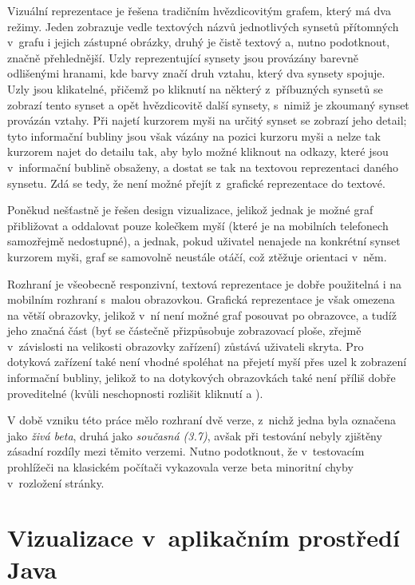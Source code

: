 \documentclass[a4paper, 11pt, oneside, showtrims]{book}
\begin{document}
					Vizuální reprezentace je řešena tradičním hvězdicovitým grafem, který má dva režimy. Jeden zobrazuje vedle textových názvů jednotlivých synsetů přítomných v~grafu i jejich zástupné obrázky, druhý je čistě textový a, nutno podotknout, značně přehlednější. Uzly reprezentující synsety jsou provázány barevně odlišenými hranami, kde barvy značí druh vztahu, který dva synsety spojuje. Uzly jsou klikatelné, přičemž po kliknutí na některý z~příbuzných synsetů se zobrazí tento synset a opět hvězdicovitě další synsety, s~nimiž je zkoumaný synset provázán vztahy. Při najetí kurzorem myši na určitý synset se zobrazí jeho detail; tyto informační bubliny jsou však vázány na pozici kurzoru myši a nelze tak kurzorem najet do detailu tak, aby bylo možné kliknout na odkazy, které jsou v~informační bublině obsaženy, a dostat se tak na textovou reprezentaci daného synsetu. Zdá se tedy, že není možné přejít z~grafické reprezentace do textové.

					Poněkud nešťastně je řešen design vizualizace, jelikož jednak je možné graf přibližovat a oddalovat pouze kolečkem myší (které je na mobilních telefonech samozřejmě nedostupné), a jednak, pokud uživatel nenajede na konkrétní synset kurzorem myši, graf se samovolně neustále otáčí, což ztěžuje orientaci v~něm.

					Rozhraní je všeobecně responzivní, textová reprezentace je dobře použitelná i na mobilním rozhraní s~malou obrazovkou. Grafická reprezentace je však omezena na větší obrazovky, jelikož v~ní není možné graf posouvat po obrazovce, a tudíž jeho značná část (byť se částečně přizpůsobuje zobrazovací ploše, zřejmě v~závislosti na velikosti obrazovky zařízení) zůstává uživateli skryta. Pro dotyková zařízení také není vhodné spoléhat na přejetí myší přes uzel k zobrazení informační bubliny, jelikož to na dotykových obrazovkách také není příliš dobře proveditelné (kvůli neschopnosti rozlišit kliknutí a ).

					V době vzniku této práce mělo rozhraní dvě verze, z~nichž jedna byla označena jako \textit{živá beta}, druhá jako \textit{současná (3.7)}, avšak při testování nebyly zjištěny zásadní rozdíly mezi těmito verzemi. Nutno  podotknout, že v~testovacím prohlížeči na klasickém počítači vykazovala verze beta minoritní chyby v~rozložení stránky.

			\section{Vizualizace v~aplikačním prostředí Java}
\end{document}
